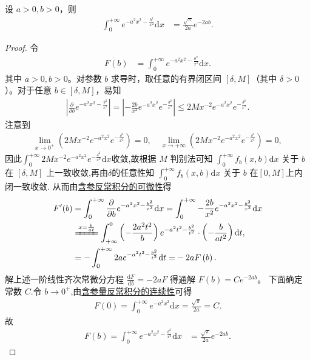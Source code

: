 \documentclass[../../main.tex]{subfiles}%
\begin{document}
\begin{proposition}\label{proposition:高斯积分推论}
设 \(a>0, b>0\)，则
\begin{align*}
\int_{0}^{+\infty} e^{-a^2 x^2 - \frac{b^2}{x^2}} \mathrm{d}x &= \frac{\sqrt{\pi}}{2a} e^{-2ab}. 
\end{align*}
\end{proposition}
\begin{proof}
令
\begin{align*}
F(b) &= \int_{0}^{+\infty} e^{-a^2 x^2 - \frac{b^2}{x^2}} \mathrm{d}x.
\end{align*}
其中 \(a > 0, b > 0\)。对参数 \(b\) 求导时，取任意的有界闭区间 \([\delta, M]\)（其中 \(\delta > 0\)）。对于任意 \(b \in [\delta, M]\)，易知
\begin{align*}
\left| \frac{\partial}{\partial b} e^{-a^2 x^2 - \frac{b^2}{x^2}} \right| = \left| -\frac{2b}{x^2} e^{-a^2 x^2} e^{-\frac{b^2}{x^2}} \right| \leq 2M x^{-2} e^{-a^2 x^2} e^{-\frac{\delta^2}{x^2}}.
\end{align*}
注意到
\begin{align*}
\underset{x\rightarrow 0^+}{\lim}\left( 2Mx^{-2}e^{-a^2x^2}e^{-\frac{\delta ^2}{x^2}} \right) =0,\quad \underset{x\rightarrow +\infty}{\lim}\left( 2Mx^{-2}e^{-a^2x^2}e^{-\frac{\delta ^2}{x^2}} \right) =0,
\end{align*}
因此$\int_0^{+\infty}{2Mx^{-2}e^{-a^2x^2}e^{-\frac{\delta ^2}{x^2}}\mathrm{d}x}$收敛,故根据 \(M\) 判别法可知 \(\int_0^{+\infty} f_b(x, b) \mathrm{d}x\) 关于 \(b\) 在 \([\delta, M]\) 上一致收敛,再由$\delta$的任意性知 \(\int_0^{+\infty} f_b(x, b) \mathrm{d}x\) 关于 \(b\) 在$[0,M]$上内闭一致收敛.
从而由\hyperref[theorem:含参反常积分的可微性]{含参反常积分的可微性}得
\begin{align*}
F' (b)&=\int_0^{+\infty}{\frac{\partial}{\partial b}e^{-a^2x^2-\frac{b^2}{x^2}}\mathrm{d}x}=\int_0^{+\infty}{-\frac{2b}{x^2}e^{-a^2x^2-\frac{b^2}{x^2}}\mathrm{d}x}
\\
&\xlongequal{x=\frac{b}{at}}\int_{+\infty}^0{\left( -\frac{2a^2t^2}{b} \right) e^{-a^2t^2-\frac{b^2}{t^2}}}\cdot \left( -\frac{b}{at^2} \right) \mathrm{d}t,
\\
&=-\int_0^{+\infty}{2ae^{-a^2t^2-\frac{b^2}{t^2}}\mathrm{d}t=}-2aF\left( b \right) .
\end{align*}
解上述一阶线性齐次常微分方程 \(\frac{\mathrm{d}F}{\mathrm{d}b} = -2a F\) 得通解 \(F(b) = C e^{-2ab}\)。
下面确定常数 \(C\).令 \(b \to 0^+\),由\hyperref[theorem:含参量反常积分的连续性]{含参量反常积分的连续性}可得
\begin{align*}
F(0) = \int_{0}^{+\infty} e^{-a^2 x^2} \mathrm{d}x = \frac{\sqrt{\pi}}{2a} = C.
\end{align*}
故
\begin{align*}
F(b)=\int_{0}^{+\infty} e^{-a^2 x^2 - \frac{b^2}{x^2}} \mathrm{d}x &= \frac{\sqrt{\pi}}{2a} e^{-2ab}. 
\end{align*}
\end{proof}
\end{document}
